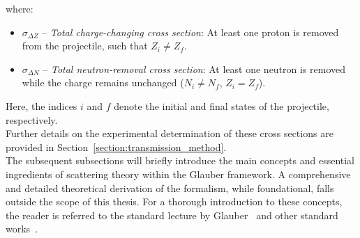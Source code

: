 where:
\begin{itemize}
    \item \boldmath$\sigma_{\Delta Z}$\unboldmath{} -- \textit{Total charge-changing cross section}: At least one proton is removed from the projectile, such that $Z_i \neq Z_f$.
    
    \item \boldmath$\sigma_{\Delta N}$\unboldmath{} -- \textit{Total neutron-removal cross section}: At least one neutron is removed while the charge remains unchanged ($N_i \neq N_f$, $Z_i = Z_f$).
\end{itemize}
Here, the indices $i$ and $f$ denote the initial and final states of the projectile, respectively.\\
Further details on the experimental determination of these cross sections are provided in Section~\ref{section:transmission_method}.\\
The subsequent subsections will briefly introduce the main concepts and essential ingredients of scattering theory within the Glauber framework. A comprehensive and detailed theoretical derivation of the formalism, while foundational, falls outside the scope of this thesis. For a thorough introduction to these concepts, the reader is referred to the standard lecture by Glauber~\cite{glauber1959lectures} and other standard works~\cite{sitenko1990theory,lilley2013nuclear,bertulani2019introduction,obertelli2021modern}.\\


